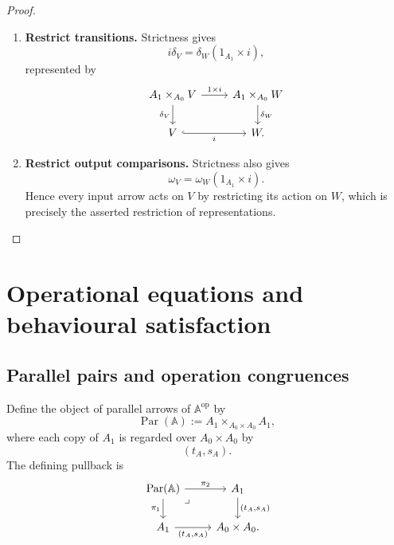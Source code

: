 \begin{proof}
    \leavevmode
    \begin{enumerate}
        \item \textbf{Restrict transitions.}
        Strictness gives
        \[
            i\delta_V
            =
            \delta_W(1_{A_1}\times i),
        \]
        represented by
        \[
        \begin{tikzcd}
            A_1\times_{A_0}V
                \arrow[r, "1\times i"]
                \arrow[d, "\delta_V"']
            &
            A_1\times_{A_0}W
                \arrow[d, "\delta_W"]
            \\
            V
                \arrow[r, hook, "i"']
            &
            W.
        \end{tikzcd}
        \]

        \item \textbf{Restrict output comparisons.}
        Strictness also gives
        \[
            \omega_V
            =
            \omega_W(1_{A_1}\times i).
        \]
        Hence every input arrow acts on \(V\) by restricting its action on
        \(W\), which is precisely the asserted restriction of
        representations.
    \end{enumerate}
\end{proof}

\section{Operational equations and behavioural satisfaction}
\label{sec:to-operational-equations-satisfaction}

\subsection{Parallel pairs and operation congruences}
\label{subsec:to-parallel-pairs-congruences}

Define the object of parallel arrows of \(\mathbb A^{\mathrm{op}}\) by
\[
    \operatorname{Par}(\mathbb A)
    :=
    A_1
    \times_{A_0\times A_0}
    A_1,
\]
where each copy of \(A_1\) is regarded over \(A_0\times A_0\) by
\[
    (t_A,s_A).
\]
The defining pullback is
\[
\begin{tikzcd}
    \operatorname{Par}(\mathbb A)
        \arrow[r, "\pi_2"]
        \arrow[d, "\pi_1"']
        \arrow[dr, phantom, "\lrcorner", very near start]
    &
    A_1
        \arrow[d, "{(t_A,s_A)}"]
    \\
    A_1
        \arrow[r, "{(t_A,s_A)}"']
    &
    A_0\times A_0.
\end{tikzcd}
\]

